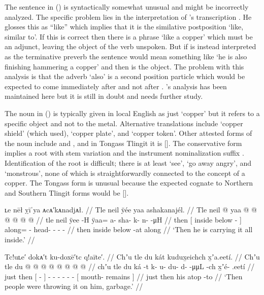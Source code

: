 The sentence in (\lastx) is syntactically somewhat unusual and might be incorrectly analyzed.
The specific problem lies in the interpretation of \citeauthor{swanton:1909}’s transcription .
He glosses this as “like” which implies that it is the similative postposition  ‘like, similar to’.
If this is correct then there is a phrase  ‘like a copper’ which must be an adjunct, leaving the object of the verb unspoken.
But if  is instead interpreted as the terminative preverb  the sentence would mean something like ‘he is also finishing hammering a copper’ and then  is the object.
The problem with this analysis is that the adverb  ‘also’ is a second position particle which would be expected to come immediately after  and not after .
\citeauthor{swanton:1909}’s analysis has been maintained here but it is still in doubt and needs further study.

The noun  in (\lastx) is typically given in local English as just ‘copper’ but it refers to a specific object and not to the metal.
Alternative translations include ‘copper shield’ (which \citeauthor{swanton:1909} used), ‘copper plate’, and ‘copper token’.
Other attested forms of the noun include  and , and in Tongass Tlingit it is  [].
The conservative form  implies a root  with  stem variation and the instrument nominalization suffix .
Identification of the root is difficult; there is at least  ‘see’,  ‘go away angry’, and  ‘monstrous’, none of which is straightforwardly connected to the concept of a  copper.
The Tongass form  is unusual because the expected cognate to Northern and Southern Tlingit forms would be  [].

\ex\label{ex:89-144-lug-inside}%
%
\begingl
	\glpreamble	ʟe nēł ỵīˈya ᴀcᴀ′kᴀnadjᴀł. //
	\glpreamble	Tle neil ÿée yaa ashakanajél. //
	\gla	Tle {} neil  @ {} {}
		yaa @  @ {} @ {} @ {} @ {} @ {} //
	\glb	tle {} neil ÿee -H {}
		ÿaa= a- sha- k- n-  -μH //
	\glc	then {}[ inside below - {}]
		along= - head- - -  - //
	\gld	then {} inside below -at {}
		along  {} {} {} {} {} //
	\glft	‘Then he is carrying it all inside.’
		//
\endgl
\xe

\ex\label{ex:89-145-throw-garbage-on-him}%
%
\begingl
	\glpreamble	Tc!uʟe′ dokᴀ′t ku-doxē′tc q!aīte′. //
	\glpreamble	Chʼu tle du kát kudux̱eichch x̱ʼa.eetí. //
	\gla	Chʼu tle {} du  @ {} {}
		 @ {} @ {} @ {} @ {} @ {} @ {}
		{}  @ {} {} //
	\glb	chʼu tle {} du ká -t {}
		k- u- du- d-  -μμL -ch
		{} x̱ʼé- .eetí {} //
	\glc	just then {}[   - {}]
		- - - -  - -
		{}[ mouth- remains {}] //
	\gld	just then {} his atop -to {}
		 {} {} {} {} {} {}
		{}  {} {} //
	\glft	‘Then people were throwing it on him, garbage.’
		//
\endgl
\xe

